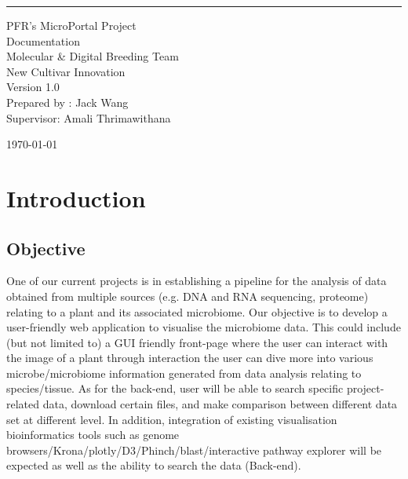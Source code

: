\documentclass{scrreprt}
\date{}
\def\myversion{1.0 }
\begin{document}
\begin{flushright}
    \rule{16cm}{5pt}\vskip1cm
    \begin{bfseries}
        \Huge{PFR's MicroPortal Project\\ Documentation}\\
        \vspace{1.5cm}
        \vspace{1.5cm}
        {\LARGE Molecular \& Digital Breeding Team}\\
        \vspace{0.3cm}
        {\large New Cultivar Innovation}\\
        \vspace{1.5cm}
        \small{Version \myversion}\\
        \vspace{1.5cm}
        Prepared by : Jack Wang
        \\
        Supervisor: Amali Thrimawithana 
        
        \today\\
    \end{bfseries}
\end{flushright}

\tableofcontents

\chapter{Introduction}

\section{Objective}
One of our current projects is in establishing a pipeline for the analysis of data obtained from multiple sources (e.g. DNA and RNA sequencing, proteome) relating to a plant and its associated microbiome. Our objective is to develop a user-friendly web application to visualise the microbiome data. This could include (but not limited to) a GUI friendly front-page where the user can interact with the image of a plant through interaction the user can dive more into various microbe/microbiome information generated from data analysis relating to species/tissue. As for the back-end, user will be able to search specific project-related data, download certain files, and make comparison between different data set at different level.  In addition, integration of existing visualisation bioinformatics tools such as genome browsers/Krona/plotly/D3/Phinch/blast/interactive pathway explorer will be expected as well as the ability to search the data (Back-end).
\end{document}
